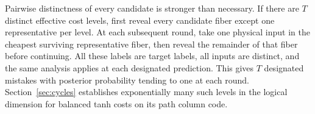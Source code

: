 Pairwise distinctness of every candidate is stronger than necessary.
If there are $T$ distinct effective cost levels, first reveal every
candidate fiber except one representative per level. At each subsequent
round, take one physical input in the cheapest surviving representative
fiber, then reveal the remainder of that fiber before continuing. All
these labels are target labels, all inputs are distinct, and the
same analysis applies at each designated prediction. This gives
$T$ designated mistakes with posterior probability tending to one at
each round. Section~\ref{sec:cycles} establishes exponentially many such levels
in the logical dimension for balanced tanh costs on its path column code.
